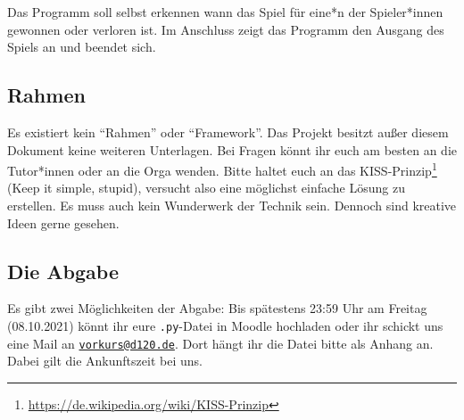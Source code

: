 \documentclass[ngerman,accentcolor=3c,colorbacktitle,12pt,T1]{tudaexercise}
\begin{document}
Das Programm soll selbst erkennen wann das Spiel für eine*n der Spieler*innen gewonnen oder verloren ist.
Im Anschluss zeigt das Programm den Ausgang des Spiels an und beendet sich.

\subsection*{Rahmen}
Es existiert kein \enquote{Rahmen} oder \enquote{Framework}.
Das Projekt besitzt außer diesem Dokument keine weiteren Unterlagen.
Bei Fragen könnt ihr euch am besten an die Tutor*innen oder an die Orga wenden.
Bitte haltet euch an das KISS-Prinzip\footnote[2]{\url{https://de.wikipedia.org/wiki/KISS-Prinzip}} (Keep it simple, stupid), versucht also eine möglichst einfache Lösung zu erstellen.
Es muss auch kein Wunderwerk der Technik sein.
Dennoch sind kreative Ideen gerne gesehen.

\subsection*{Die Abgabe}
Es gibt zwei Möglichkeiten der Abgabe: Bis spätestens 23:59 Uhr am Freitag (08.10.2021) könnt ihr eure \texttt{.py}-Datei in Moodle hochladen oder ihr schickt uns eine Mail an \href{mailto:vorkurs@d120.de}{\nolinkurl{vorkurs@d120.de}}.
Dort hängt ihr die Datei bitte als Anhang an.
Dabei gilt die Ankunftszeit bei uns.
\end{document}
